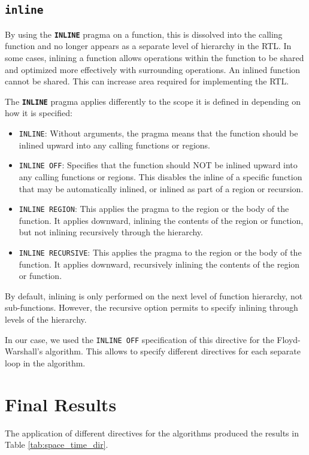 \subsection{\texttt{inline}}

By using the \texttt{\textbf{INLINE}} pragma on a function, this is dissolved into the calling function and no longer appears as a separate level of hierarchy in the RTL. In some cases, inlining a function allows operations within the function to be shared and optimized more effectively with surrounding operations. An inlined function cannot be shared. This can increase area required for implementing the RTL.

The \texttt{\textbf{INLINE}} pragma applies differently to the scope it is defined in depending on how it is specified:
\begin{itemize}
\item \texttt{INLINE}: Without arguments, the pragma means that the function should be inlined upward into any calling functions or regions.
\item \texttt{INLINE OFF}: Specifies that the function should NOT be inlined upward into any calling functions or regions. This disables the inline of a specific function that may be automatically inlined, or inlined as part of a region or recursion.
\item \texttt{INLINE REGION}: This applies the pragma to the region or the body of the function. It applies downward, inlining the contents of the region or function, but not inlining recursively through the hierarchy.
\item \texttt{INLINE RECURSIVE}: This applies the pragma to the region or the body of the function. It applies downward, recursively inlining the contents of the region or function.
\end{itemize}
By default, inlining is only performed on the next level of function hierarchy, not sub-functions. However, the recursive option permits to specify inlining through levels of the hierarchy.

In our case, we used the \texttt{INLINE OFF} specification of this directive for the Floyd-Warshall's algorithm. This allows to specify different directives for each separate loop in the algorithm.

\section{Final Results}

The application of different directives for the algorithms produced the results in Table \ref{tab:space_time_dir}.

